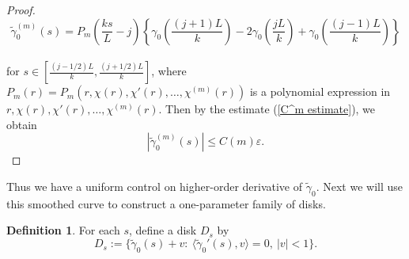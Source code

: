 \documentclass[a4paper, reqno]{amsart}
\theoremstyle{definition}
\newtheorem{definition}{Definition}[section]
\theoremstyle{remark}
\numberwithin{equation}{section}
\numberwithin{equation}{section}
\numberwithin{equation}{section}
\begin{document}
\begin{proof}
\[ \tilde{\gamma}_0^{(m)}(s) = P_m\left(\frac{ks}{L}-j\right) \left\{\gamma_0\left(\frac{(j+1)L}{k}\right) - 2\gamma_0\left(\frac{jL}{k}\right) + \gamma_0\left(\frac{(j-1)L}{k}\right)\right\}\]\\
for $s\in \left[\frac{(j - 1/2)L}{k}, \frac{(j + 1/2)L}{k}\right]$, where $P_m(r) = P_m(r,\chi(r), \chi'(r),\hdots, \chi^{(m)}(r))$ is a polynomial expression in $r, \chi(r),  \chi'(r),\hdots, \chi^{(m)}(r)$. Then by the estimate (\ref{C^m estimate}), we obtain
\[ |\tilde{\gamma}_0^{(m)}(s)| \leq C(m)\varepsilon.\]
\end{proof}




\bigskip


Thus we have a uniform control on higher-order derivative of $\tilde{\gamma}_0$. Next we will use this smoothed curve to construct a one-parameter family of disks. 

\begin{definition} For each $s$, define a disk $D_s$ by
\[ D_s := \{\tilde{\gamma}_0(s) + v:\ \langle \tilde{\gamma}_0'(s), v\rangle = 0,\ |v|< 1\}.\]
\end{definition}

\bigskip
\end{document}
